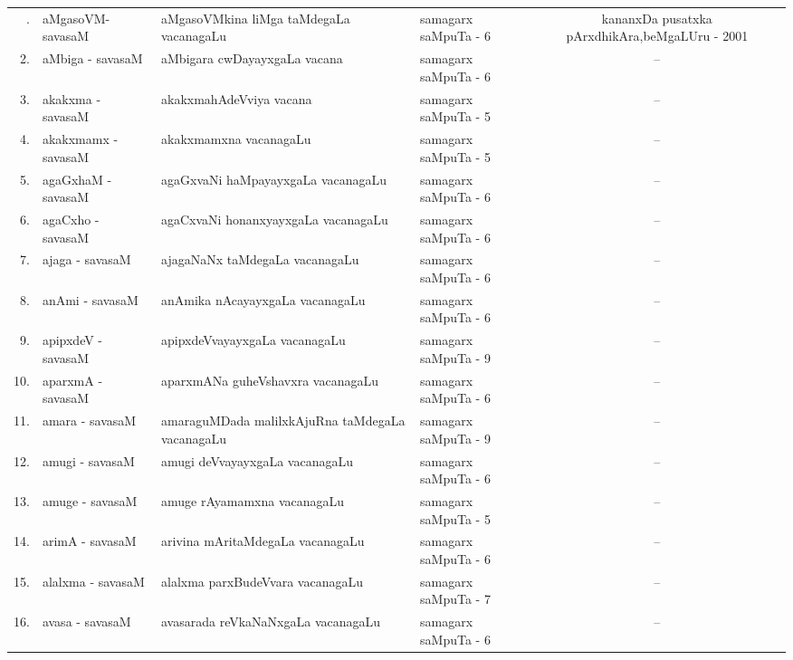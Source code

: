 {\renewcommand{\arraystretch}{1.35}
\begin{longtable}{rl>{\raggedright}p{5.5cm}lc}
\hline
\endfirsthead
\hline
\endhead
\hline
\endfoot
\endlastfoot
1. & aMgasoVM-savasaM & aMgasoVMkina liMga taMdegaLa vacanagaLu & samagarx saMpuTa - 6 & \multicolumn{1}{p{3.5cm}}{kananxDa pusatxka pArxdhikAra,\newline beMgaLUru - 2001}\\
2. & aMbiga - savasaM & aMbigara cwDayayxgaLa vacana & samagarx saMpuTa - 6 & --\\
3. & akakxma - savasaM & akakxmahAdeVviya vacana & samagarx saMpuTa - 5 & --\\
4. & akakxmamx - savasaM & akakxmamxna vacanagaLu & samagarx saMpuTa - 5 & --\\
5. & agaGxhaM - savasaM & agaGxvaNi haMpayayxgaLa vacanagaLu & samagarx saMpuTa - 6 & --\\
6. & agaCxho - savasaM & agaCxvaNi honanxyayxgaLa vacanagaLu & samagarx saMpuTa - 6 & --\\
7. & ajaga - savasaM & ajagaNaNx taMdegaLa vacanagaLu & samagarx saMpuTa - 6 & --\\
8. & anAmi - savasaM & anAmika nAcayayxgaLa vacanagaLu & samagarx saMpuTa - 6 & --\\
9. & apipxdeV - savasaM & apipxdeVvayayxgaLa vacanagaLu & samagarx saMpuTa - 9 & --\\
10. & aparxmA - savasaM & aparxmANa guheVshavxra vacanagaLu & samagarx saMpuTa - 6 & --\\
11. & amara - savasaM & amaraguMDada malilxkAjuRna taMdegaLa vacanagaLu & samagarx saMpuTa - 9 & --\\
12. & amugi - savasaM & amugi deVvayayxgaLa vacanagaLu & samagarx saMpuTa - 6 & --\\
13. & amuge - savasaM & amuge rAyamamxna vacanagaLu & samagarx saMpuTa - 5 & --\\
14. & arimA - savasaM & arivina mAritaMdegaLa vacanagaLu & samagarx saMpuTa - 6 & --\\
15. & alalxma - savasaM & alalxma parxBudeVvara vacanagaLu & samagarx saMpuTa - 7 & --\\
16. & avasa - savasaM &  avasarada reVkaNaNxgaLa vacanagaLu & samagarx saMpuTa - 6 & --\\
\hline
\end{longtable}}
\bigskip

